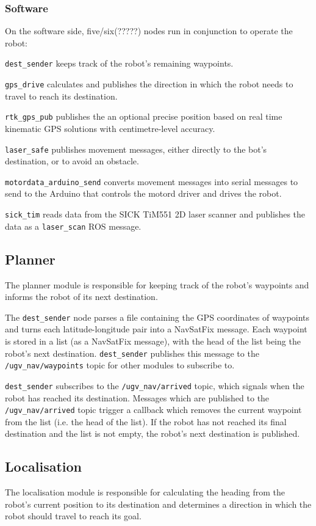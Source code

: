 \documentclass[titlepage,12pt,a4paper]{article}
\begin{document}
\subsubsection{Software}

On the software side, five/six(?????) nodes run in conjunction to operate the robot:

\verb|dest_sender| keeps track of the robot's remaining waypoints.

\verb|gps_drive| calculates and publishes the direction in which the robot needs to travel to reach its destination.

\verb|rtk_gps_pub| publishes the an optional precise position based on real time kinematic GPS solutions with centimetre-level accuracy.

\verb|laser_safe| publishes movement messages, either directly to the bot's destination, or to avoid an obstacle.

\verb|motordata_arduino_send| converts movement messages into serial messages to send to the Arduino that controls the motord driver and drives the robot.

\verb|sick_tim| reads data from the SICK TiM551 2D laser scanner and publishes the data as a \verb|laser_scan| ROS message.

\pagebreak

\subsection{Planner}
The planner module is responsible for keeping track of the robot's waypoints and informs the robot of its next destination. 

The \verb|dest_sender| node parses a file containing the GPS coordinates of waypoints and turns each latitude-longitude pair into a NavSatFix message. Each waypoint is stored in a list (as a NavSatFix message), with the head of the list being the robot's next destination. \verb|dest_sender| publishes this message to the \verb|/ugv_nav/waypoints| topic for other modules to subscribe to.

\verb|dest_sender| subscribes to the \verb|/ugv_nav/arrived| topic, which signals when the robot has reached its destination. Messages which are published to the \verb|/ugv_nav/arrived| topic trigger a callback which removes the current waypoint from the list (i.e. the head of the list). If the robot has not reached its final destination and the list is not empty, the robot's next destination is published.

\subsection{Localisation}
The localisation module is responsible for calculating the heading from the robot's current position to its destination and determines a direction in which the robot should travel to reach its goal.
\end{document}
